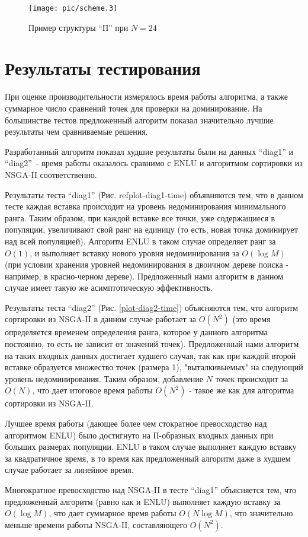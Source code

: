 \begin{figure}
\centering
\texttt{[image: pic/scheme.3]}
\caption{Пример структуры ``П'' при $N = 24$}\label{parper-fig}
\end{figure}

\section{Результаты тестирования}

При оценке производительности измерялось время работы алгоритма, а также суммарное число 
сравнений точек для проверки на доминирование. На большинстве тестов предложенный алгоритм 
показал значительно лучшие результаты чем сравниваемые решения.

Разработанный алгоритм показал худшие результаты были  на данных ``diag1'' и ``diag2''~- 
время работы оказалось сравнимо с ENLU и алгоритмом сортировки из NSGA-II соответственно.

Результаты теста ``diag1'' (Рис. ref{plot-diag1-time}) объявняются тем, что в данном тесте 
каждая вставка происходит на уровень недоминирования минимального ранга. Таким образом, при 
каждой вставке все точки, уже содержащиеся в популяции, увеличивают свой ранг на единицу (то есть,
новая точка доминирует над всей популяцией). Алгоритм ENLU в таком случае определяет ранг за $O(1)$, 
и выполняет вставку нового уровня недоминирования за $O(\log M)$ (при условии хранения уровней 
недоминирования в двоичном дереве поиска - например, в красно-черном дереве). Предложенный 
нами алгоритм в данном случае имеет такую же асимптотическую эффективность.

Результаты теста ``diag2'' (Рис. \ref{plot-diag2-time}) объясняются тем, что алгоритм сортировки 
из NSGA-II в данном случае работает за $O(N^2)$ (это время определяется временем определения ранга,
которое у данного алгоритма постоянно, то есть не зависит от значений точек). 
Предложенный нами алгоритм на таких входных данных достигает худшего случая, так как при каждой 
второй вставке образуется множество точек (размера 1), "выталкивыемых" на следующий уровень 
недоминирования. Таким образом, добавление $N$ точек происходит за $O(N)$, что дает итоговое время 
работы $O(N^2)$ - такое же как для алгоритма сортировки из NSGA-II.

Лучшее время работы (дающее более чем стократное превосходство над алгоритмом ENLU) было достигнуто
на П-образных входных данных при больших размерах популяции. ENLU в таком случае выполняет каждую вставку
за квадратичное время, в то время как предложенный алгоритм даже в худшем случае работает за линейное время.

Многократное превосходство над NSGA-II в тесте ``diag1'' объясняется тем, что предложенный
алгоритм (равно как и ENLU) выполняет каждую вставку за $O(\log M)$, что дает суммарное время работы $O(N \log M)$,
что значительно меньше времени работы NSGA-II, составляющего $O(N^2)$.